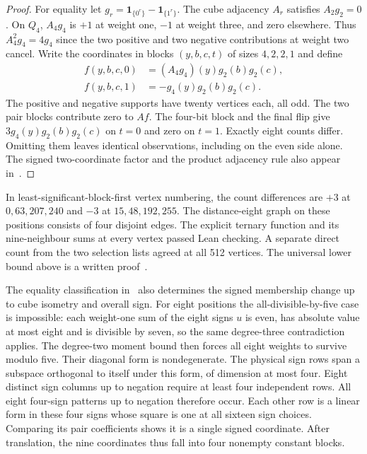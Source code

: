 \documentclass[11pt,a4paper]{article}
\theoremstyle{definition}
\theoremstyle{remark}
\begin{document}
\begin{proof}
For equality let $g_r=\mathbf1_{\{0^r\}}-\mathbf1_{\{1^r\}}$.
The cube adjacency $A_r$ satisfies $A_2g_2=0$.
On $Q_4$, $A_4g_4$ is $+1$ at weight one, $-1$ at weight three,
and zero elsewhere. Thus $A_4^2g_4=4g_4$ since the two positive
and two negative contributions at weight two cancel. Write the
coordinates in blocks $(y,b,c,t)$ of sizes $4,2,2,1$ and define
\[
\begin{aligned}
 f(y,b,c,0)&=(A_4g_4)(y)g_2(b)g_2(c),\\
 f(y,b,c,1)&=-g_4(y)g_2(b)g_2(c).
\end{aligned}
\]
The positive and negative supports have twenty vertices each, all odd.
The two pair blocks contribute zero to $Af$. The four-bit block and
the final flip give $3g_4(y)g_2(b)g_2(c)$ on $t=0$ and zero on $t=1$.
Exactly eight counts differ. Omitting them leaves identical observations,
including on the even side alone. The signed two-coordinate factor
and the product adjacency rule also appear in~\cite{tensor241}.
\end{proof}

In least-significant-block-first vertex numbering, the count differences
are $+3$ at $0,63,207,240$ and $-3$ at $15,48,192,255$. The
distance-eight graph on these positions consists of four disjoint edges.
The explicit ternary function and its nine-neighbour sums at every
vertex passed Lean checking. A separate direct count from the two
selection lists agreed at all 512 vertices. The universal lower bound
above is a written proof~\cite{research241}.

The equality classification in~\cite{research241} also determines the
signed membership change up to cube isometry and overall sign. For eight
positions the all-divisible-by-five case is impossible: each weight-one
sum of the eight signs $u$ is even, has absolute value at most eight and
is divisible by seven, so the same degree-three contradiction applies.
The degree-two moment bound then forces all eight weights to survive
modulo five. Their diagonal form is nondegenerate. The physical sign
rows span a subspace orthogonal to itself under this form, of dimension
at most four. Eight distinct sign columns up to negation require at
least four independent rows. All eight four-sign patterns up to negation
therefore occur. Each other row is a linear form in these four signs
whose square is one at all sixteen sign choices. Comparing its pair
coefficients shows it is a single signed coordinate. After translation,
the nine coordinates thus fall into four nonempty constant blocks.
\end{document}
